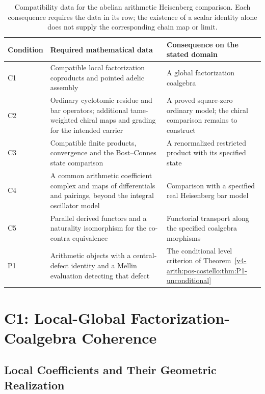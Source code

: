 \begin{table}[h]
\centering
\small
\begin{tabular}{@{}p{}|p{}|p{}@{}}
Condition & Required mathematical data & Consequence on the stated domain \\
\hline
C1 & Compatible local factorization coproducts and pointed adelic assembly & A global factorization coalgebra \\
C2 & Ordinary cyclotomic residue and bar operators; additional tame-weighted chiral maps and grading for the intended carrier & A proved square-zero ordinary model; the chiral comparison remains to construct \\
C3 & Compatible finite products, convergence and the Bost--Connes state comparison & A renormalized restricted product with its specified state \\
C4 & A common arithmetic coefficient complex and maps of differentials and pairings, beyond the integral oscillator model & Comparison with a specified real Heisenberg bar model \\
C5 & Parallel derived functors and a naturality isomorphism for the co-contra equivalence & Functorial transport along the specified coalgebra morphisms \\
P1 & Arithmetic objects with a central-defect identity and a Mellin evaluation detecting that defect & The conditional level criterion of Theorem~\ref{v4-arith:pos-costello:thm:P1-unconditional} \\
\end{tabular}
\caption{Compatibility data for the abelian arithmetic Heisenberg comparison.
Each consequence requires the data in its row; the existence of a scalar
identity alone does not supply the corresponding chain map or limit.}
\label{v4-arith:pos-costello:tab:table}
\end{table}

\section{C1: Local-Global Factorization-Coalgebra Coherence}
\label{v4-arith:pos-costello:C1}

\subsection{Local Coefficients and Their Geometric Realization}

